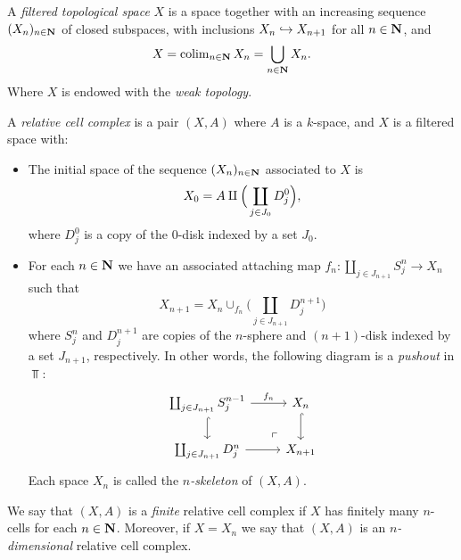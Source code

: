 \begin{definition}
    \label{def:filtered-space}
    A \emph{filtered topological space} \(X\) is a space together with an increasing
    sequence \((X_n)_{n \in \mathbf{N}}\) of closed subspaces, with inclusions
    \(X_n \hookrightarrow X_{n+1}\) for all \(n \in \mathbf{N}\), and
    \[
        X = \operatorname{colim}_{n \in \mathbf{N}} X_n = \bigcup_{n \in \mathbf{N}} X_n.
    \]
    Where \(X\) is endowed with the \emph{weak topology}.
\end{definition}

\begin{definition}
    \label{def:relative-cell-complex}
    A \emph{relative cell complex} is a pair \((X, A)\) where \(A\) is a
    \(k\)-space, and \(X\) is a filtered space with:
    \begin{itemize}\setlength\itemsep{0em}
        \item The initial space of the sequence \((X_n)_{n \in \mathbf{N}}\) associated to \(X\)
              is
              \[
                  X_0 = A \amalg \Big( \coprod_{j \in J_0} D_j^0 \Big),
              \]
              where \(D_j^0\) is a copy of the \(0\)-disk indexed by a set \(J_0\).

        \item For each \(n \in \mathbf{N}\) we have an associated attaching map
              \(f_n: \coprod_{j \in J_{n+1}} S_j^n \to X_n\) such that
              \[
                  X_{n+1} = X_n \cup_{f_n} \Big( \coprod_{j \in J_{n+1}} D_j^{n+1} \Big)
              \]
              where \(S_j^n\) and \(D_j^{n+1}\) are copies of the \(n\)-sphere and
              \((n+1)\)-disk indexed by a set \(J_{n+1}\), respectively. In other words, the
              following diagram is a \emph{pushout} in \(\Top\):
              \[
                  \begin{tikzcd}
                      \coprod_{j \in J_{n+1}} S_j^{n-1} \ar[r, "f_n"] \ar[d, hook]
                      \ar[rd, phantom, "\ulcorner", very near end]
                      &X_n \ar[d, hook]
                      \\
                      \coprod_{j \in J_{n+1}} D_j^n \ar[r] &X_{n+1}
                  \end{tikzcd}
              \]
              Each space \(X_n\) is called the \emph{\(n\)-skeleton} of \((X, A)\).
    \end{itemize}
    We say that \((X, A)\) is a \emph{finite} relative cell complex if \(X\) has
    finitely many \(n\)-cells for each \(n \in \mathbf{N}\). Moreover, if \(X = X_n\) we say
    that \((X, A)\) is an \emph{\(n\)-dimensional} relative cell complex.


\end{definition}
